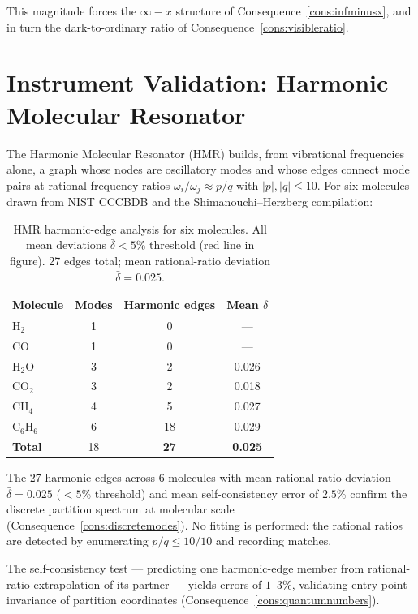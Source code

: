 This magnitude forces the $\infty-x$ structure of
Consequence~\ref{cons:infminusx}, and in turn the dark-to-ordinary ratio
of Consequence~\ref{cons:visibleratio}.

\section{Instrument Validation: Harmonic Molecular Resonator}
\label{sec:hmr-ch25}

The Harmonic Molecular Resonator (HMR) builds, from vibrational frequencies
alone, a graph whose nodes are oscillatory modes and whose edges connect
mode pairs at rational frequency ratios $\omega_{i}/\omega_{j}\approx p/q$
with $|p|,|q|\leq 10$.  For six molecules drawn from NIST CCCBDB and the
Shimanouchi--Herzberg compilation:

\begin{table}[htbp]
\centering
\caption{HMR harmonic-edge analysis for six molecules.
All mean deviations $\bar\delta < 5$\% threshold (red line in figure).
27 edges total; mean rational-ratio deviation $\bar\delta=0.025$.}
\label{tab:hmr}
\begin{tabular}{@{}lccc@{}}
\toprule
Molecule & Modes & Harmonic edges & Mean $\delta$ \\
\midrule
H$_{2}$        & 1 & 0  & --- \\
CO             & 1 & 0  & --- \\
H$_{2}$O       & 3 & 2  & 0.026 \\
CO$_{2}$       & 3 & 2  & 0.018 \\
CH$_{4}$       & 4 & 5  & 0.027 \\
C$_{6}$H$_{6}$ & 6 & 18 & 0.029 \\
\midrule
\textbf{Total} & 18 & \textbf{27} & \textbf{0.025} \\
\bottomrule
\end{tabular}
\end{table}

The 27 harmonic edges across 6 molecules with mean rational-ratio deviation
$\bar\delta=0.025$ ($<5$\% threshold) and mean self-consistency error of
$2.5$\% confirm the discrete partition spectrum at molecular scale
(Consequence~\ref{cons:discretemodes}).  No fitting is performed: the
rational ratios are detected by enumerating $p/q\leq 10/10$ and recording
matches.

The self-consistency test --- predicting one harmonic-edge member from
rational-ratio extrapolation of its partner --- yields errors of $1$--$3$\%,
validating entry-point invariance of partition coordinates
(Consequence~\ref{cons:quantumnumbers}).

